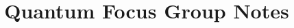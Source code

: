 \documentclass[oneside]{book}
\begin{document}
  \frontmatter

  \title{Quantum Focus Group Notes}
  \maketitle
  \tableofcontents

  \mainmatter

  
  
  
\end{document}
